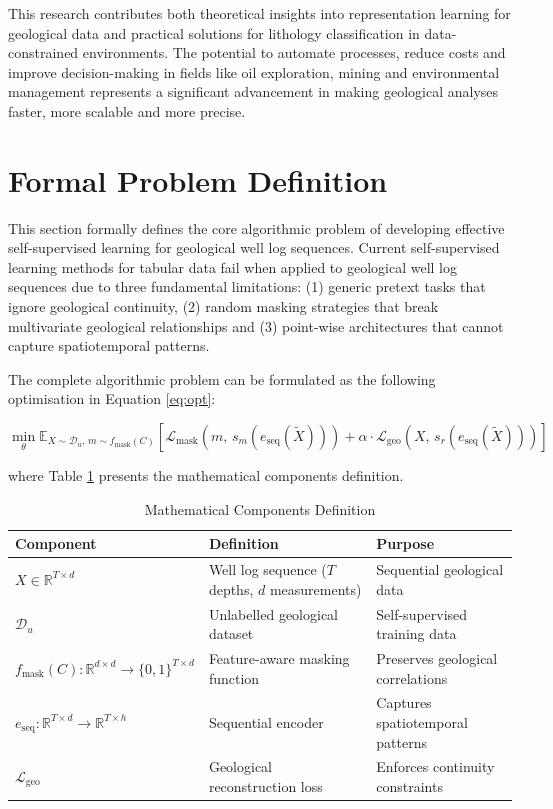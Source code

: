 This research contributes both theoretical insights into representation learning for geological data and practical solutions for lithology classification in data-constrained environments. The potential to automate processes, reduce costs and improve decision-making in fields like oil exploration, mining and environmental management represents a significant advancement in making geological analyses faster, more scalable and more precise.


\section{Formal Problem Definition}

This section formally defines the core algorithmic problem of developing effective self-supervised learning for geological well log sequences. Current self-supervised learning methods for tabular data fail when applied to geological well log sequences due to three fundamental limitations: (1) generic pretext tasks that ignore geological continuity, (2) random masking strategies that break multivariate geological relationships and (3) point-wise architectures that cannot capture spatiotemporal patterns.

The complete algorithmic problem can be formulated as the following optimisation in Equation \eqref{eq:opt}:

\begin{equation}
\min_{\theta} \mathbb{E}_{X \sim \mathcal{D}_u, \, m \sim f_{\text{mask}}(C)} \left[ \mathcal{L}_{\text{mask}}\!\left(m,\, s_m\!\left(e_{\text{seq}}(\tilde{X})\right)\right) + \alpha \cdot \mathcal{L}_{\text{geo}}\!\left(X,\, s_r\!\left(e_{\text{seq}}(\tilde{X})\right)\right) \right]
\label{eq:opt}
\end{equation}

where Table \ref{tab:mathcomp} presents the mathematical components definition.

\begin{table}[hbt!]
\centering
\caption{Mathematical Components Definition}
\label{tab:mathcomp}
\begin{tabular}{@{} l l l @{}}
\toprule
\textbf{Component} & \textbf{Definition} & \textbf{Purpose} \\
\midrule
$X \in \mathbb{R}^{T \times d}$ & Well log sequence ($T$ depths, $d$ measurements) & Sequential geological data \\
$\mathcal{D}_u$ & Unlabelled geological dataset & Self-supervised training data \\
$f_{\text{mask}}(C): \mathbb{R}^{d \times d} \to \{0,1\}^{T \times d}$ & Feature-aware masking function & Preserves geological correlations \\
$e_{\text{seq}}: \mathbb{R}^{T \times d} \to \mathbb{R}^{T \times h}$ & Sequential encoder & Captures spatiotemporal patterns \\
$\mathcal{L}_{\text{geo}}$ & Geological reconstruction loss & Enforces continuity constraints \\
\bottomrule
\end{tabular}
\end{table}


